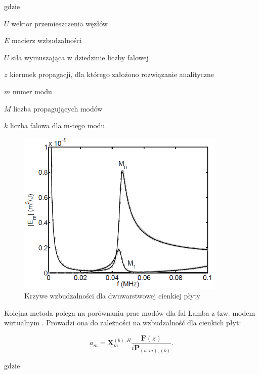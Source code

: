 gdzie
\begin{eqwhere}[2cm]
	\item[$U$] wektor przemieszczenia węzłów
	\item[$E$] macierz wzbudzalności
	\item[$U$] siła wymuszająca w dziedzinie liczby falowej
	\item[$z$] kierunek propagacji, dla którego założono rozwiązanie analityczne
	\item[$m$] numer modu
	\item[$M$] liczba propagujących modów
	\item[$k$] liczba falowa dla m-tego modu.	
\end{eqwhere}

\begin{figure}[h]
\centering
\includegraphics[width=10cm]{Zdjecia/2/wzbudzalnosc1}
\caption{Krzywe wzbudzalności dla dwuwarstwowej cienkiej płyty \cite{bartek_fabien}}
\label{fig:wzbudzalnosc1}
\end{figure}

Kolejna metoda polega na porównaniu prac modów dla fal Lamba z tzw. modem wirtualnym . Prowadzi ona do zależności na wzbudzalność dla cienkich płyt:

\begin{equation} \label{eq:wzbudzanie2}
a_m =  \textbf{X}_m^{(b), H} \frac{\textbf{F}(z)}{i\textbf{P}_{(a:m),(b)}}.
\end{equation}

gdzie


